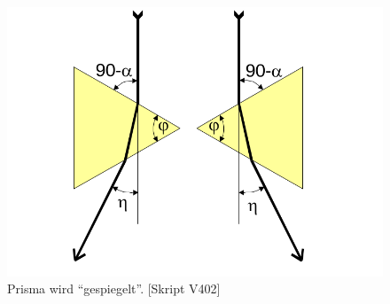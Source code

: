 \begin{figure}
  \centering
  \includegraphics[width=0.4\textheight]{../figures/spiegel.png}
  \caption{Prisma wird ``gespiegelt''. [Skript V402]}
\label{fig:spiegel}
\end{figure}